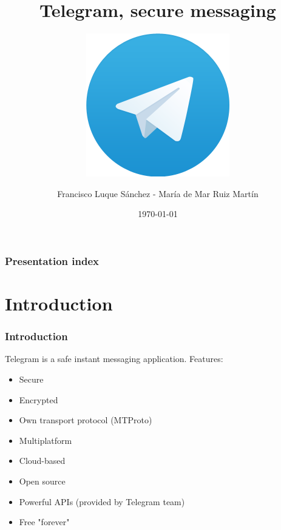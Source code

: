 \documentclass{beamer}
\title[Telegram, secure messaging]{Telegram, secure messaging} %
\subtitle{\includegraphics[scale=0.15]{images/t_logo}}
\author{Francisco Luque Sánchez - María de Mar Ruiz Martín} %
\institute[UGR] %
{
  Universidad de Granada \\ %
  \medskip
  \textit{fluque1995@correo.ugr.es - mariadel52@correo.ugr.es}\\ %
}
\date{\today} %
\begin{document}
\begin{frame}
\titlepage %
\end{frame}

\begin{frame}
  \frametitle{Presentation index} %
  \tableofcontents
\end{frame}




\section{Introduction} %

\begin{frame}
\frametitle{Introduction}
Telegram is a safe instant messaging application. Features:
\begin{itemize}
\item Secure
\item Encrypted
\item Own transport protocol (MTProto)
\item Multiplatform
\item Cloud-based
\item Open source
\item Powerful APIs (provided by Telegram team)
\item Free "forever"
\end{itemize}
\end{frame}
\end{document}
